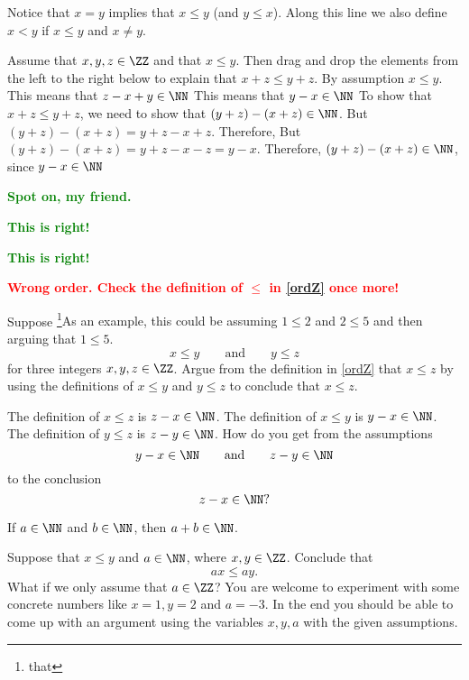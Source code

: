 \documentclass{article}
\newcommand{\red}[1]{\textcolor{red}{\textbf{#1}}}
\newcommand{\green}[1]{\textcolor{green}{\textbf{#1}}}
\begin{document}
Notice that $x = y$ implies that $x\leq y$ (and $y\leq x$).
Along this line we also define $x < y$ if $x \leq y$ and $x\neq y$.

\begin{quizexercise}[showhide]
\begin{orderquiz}
  \question
  Assume that $x, y, z\in \ZZ$ and that $x \leq y$. Then drag and drop the
  elements from the left to the right below to explain that
  $x + z \leq y + z$.
  \answer %
  By assumption $x\leq y$.
  \answer %
  This means that $z - x + y\in \NN$
  \answer %
  This means that $y - x\in \NN$
  \answer %
  To show that $x + z \leq y + z$, we need to show that
  $(y + z) - (x + z) \in \NN$.
  \answer %
  But $(y + z) - (x + z) = y + z - x + z$. Therefore,
  \answer %
  But $(y + z) - (x + z) = y + z - x - z = y - x$. Therefore,
  \answer %
  $(y + z) - (x + z)\in \NN$, since
  \answer %
  $y - x \in \NN$

  \green{Spot on, my friend.}

  \green{This is right!}
  
  \green{This is right!}

  \red{Wrong order. Check the definition of $\leq$ in \eqref{ordZ} once more!}
\end{orderquiz}
\end{quizexercise}

\beginshex
Suppose \footnote{that}{As an example, this could be assuming $1 \leq 2$ and $2 \leq 5$ and then
    arguing that $1\leq 5$.}
  $$x \leq y\qquad\text{and}\qquad y\leq z
  $$
  for three integers $x, y, z\in \ZZ$. Argue
  from the definition in \eqref{ordZ} that $x\leq z$ by using the definitions of
  $x\leq y$ and $y\leq z$ to conclude that $x\leq z$.
  
  \begin{hint}[showhide]
    The definition of $x\leq z$ is $z-x\in \NN$. The definition of $x\leq y$ is
    $y - x\in \NN$. The definition of $y\leq z$ is $z-y\in \NN$. How do you get from
    the assumptions
    $$
    y - x\in \NN\qquad\text{and}\qquad z - y\in \NN
    $$
    to the conclusion
    $$
    z - x\in \NN?
    $$
    \begin{hint}[showhide]
      If $a\in \NN$ and $b\in \NN$, then $a + b\in \NN$.
    \end{hint}
  \end{hint}
\endshex

\beginshex\label{multposordZ}
Suppose that $x\leq y$ and $a\in \NN$, where $x, y\in \ZZ$. Conclude that 
$$
a x \leq a y.
$$
What if we only assume that $a\in \ZZ$? You are welcome to experiment with
some concrete numbers like $x = 1, y = 2$ and $a = -3$. In the end
you should be able to come up with an argument using the variables
$x, y, a$ with the given assumptions.
\end{document}
